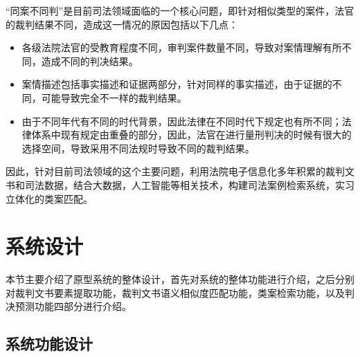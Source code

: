 “同案不同判”是目前司法领域面临的一个核心问题，即针对相似类型的案件，法官的裁判结果不同，造成这一情况的原因包括以下几点：
\begin{itemize}
    \item 各级法院法官的受教育程度不同，审判案件数量不同，导致对案情理解有所不同，造成不同的判决结果。
    \item 案情描述包括事实描述和证据两部分，针对同样的事实描述，由于证据的不同，可能导致完全不一样的裁判结果。
    \item 由于不同年代有不同的时代背景，因此法律在不同时代下规定也有所不同；法律体系中现有规定由重叠的部分，因此，法官在进行量刑判决的时候有很大的选择空间，导致采用不同法规时导致不同的裁判结果。
\end{itemize}


因此，针对目前司法领域的这个主要问题，利用法院电子信息化多年积累的裁判文书和司法数据，结合大数据，人工智能等相关技术，构建司法案例检索系统，实习立体化的类案匹配。


\section{系统设计}

本节主要介绍了原型系统的整体设计，首先对系统的整体功能进行介绍，之后分别对裁判文书要素提取功能，裁判文书语义相似度匹配功能，类案检索功能，以及判决预测功能四部分进行介绍。

\subsection{系统功能设计}

